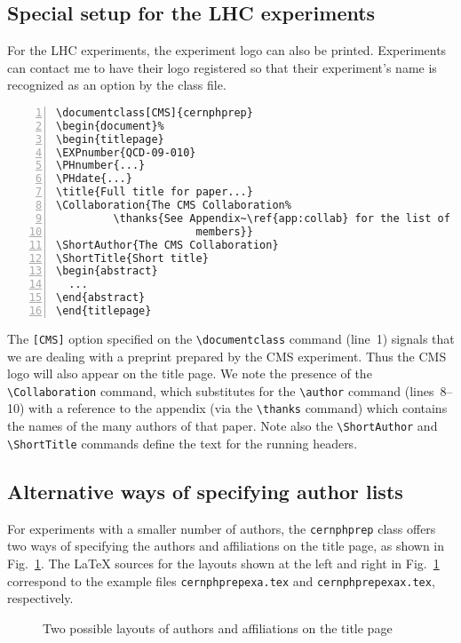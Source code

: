 \documentclass{cernphprep}
\begin{document}
\subsection{Special setup for the LHC experiments}

For the LHC experiments, the experiment logo can also be
printed. Experiments can contact me to have their logo registered so
that their experiment's name is recognized as an option by the class
file.

\begin{Verbatim}[numbers=left,fontsize=\small]
\documentclass[CMS]{cernphprep}
\begin{document}%
\begin{titlepage}
\EXPnumber{QCD-09-010}
\PHnumber{...}
\PHdate{...}
\title{Full title for paper...}
\Collaboration{The CMS Collaboration%
         \thanks{See Appendix~\ref{app:collab} for the list of collaboration 
                      members}}
\ShortAuthor{The CMS Collaboration}
\ShortTitle{Short title}
\begin{abstract}
  ...
\end{abstract}
\end{titlepage}
\end{Verbatim}
The \texttt{[CMS]} option specified on the \verb!\documentclass!
command (line~1) signals that we are dealing with a preprint prepared
by the CMS experiment. Thus the CMS logo will also appear on the title
page.  We note the presence of the \verb!\Collaboration!  command,
which substitutes for the \verb!\author! command (lines~8--10) with a
reference to the appendix (via the \verb!\thanks! command) which
contains the names of the many authors of that paper. Note also the
\verb!\ShortAuthor! and \verb!\ShortTitle! commands define the text
for the running headers.

\subsection{Alternative ways of specifying author lists}

For experiments with a smaller number of authors, the
\texttt{cernphprep} class offers two ways of specifying the authors
and affiliations on the title page, as shown in Fig.~\ref{fig:title}.
The \LaTeX{} sources for the layouts shown at the left and right in
Fig.~\ref{fig:title} correspond to the example files
\texttt{cernphprepexa.tex} and \texttt{cernphprepexax.tex}, respectively.

\begin{figure}
\centering
{}
\hfill
{}
\caption{Two possible layouts of authors and affiliations on the title page}
\label{fig:title}
\end{figure}
\end{document}
